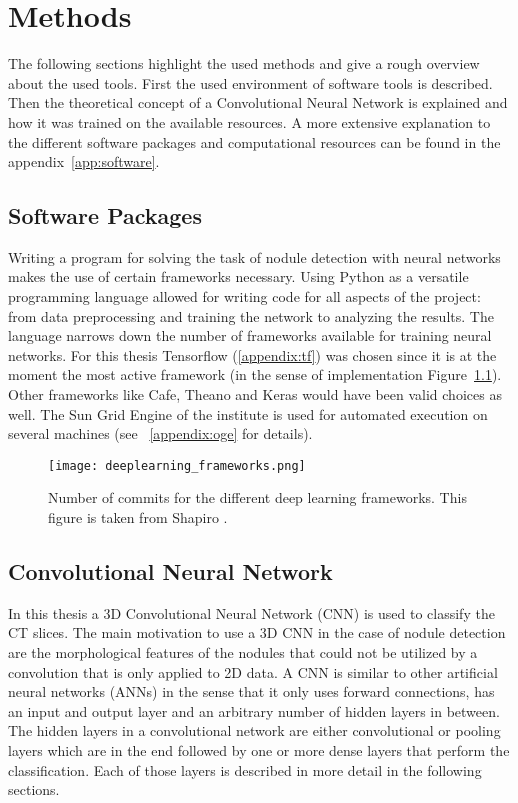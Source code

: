 \documentclass[main.tex]{subfiles}
\begin{document}
\chapter{Methods}\label{chap:methods}
The following sections highlight the used methods and give a rough overview about the used tools. First the used environment of software tools is described. Then the theoretical concept of a Convolutional Neural Network is explained and how it was trained on the available resources. A more extensive explanation to the different software packages and computational resources can be found in the appendix~\ref{app:software}.

\section{Software Packages}
Writing a program for solving the task of nodule detection with neural networks makes the use of certain frameworks necessary. Using Python as a versatile programming language allowed for writing code for all aspects of the project: from data preprocessing and training the network to analyzing the results. The language narrows down the number of frameworks available for training neural networks. For this thesis Tensorflow (\ref{appendix:tf}) was chosen since it is at the moment the most active framework (in the sense of implementation  Figure~\ref{fig:frameworks}). Other frameworks like Cafe, Theano and Keras would have been valid choices as well. The Sun Grid Engine of the institute is used for automated execution on several machines (see ~\ref{appendix:oge} for details).


\begin{figure}
\begin{center}
\texttt{[image: deeplearning\_frameworks.png]}
\end{center}
\caption{Number of commits for the different deep learning frameworks. This figure is taken from Shapiro \cite{shapiro2017}.}
\label{fig:frameworks}
\end{figure}



\section{Convolutional Neural Network}
In this thesis a 3D Convolutional Neural Network (CNN) is used to classify the CT slices. The main motivation to use a 3D CNN in the case of nodule detection are the morphological features of the nodules that could not be utilized by a convolution that is only applied to 2D data. A CNN is similar to other artificial neural networks (ANNs) in the sense that it only uses forward connections, has an input and output layer and an arbitrary number of hidden layers in between. The hidden layers in a convolutional network are either convolutional or pooling layers which are in the end followed by one or more dense layers that perform the classification. Each of those layers is described in more detail in the following sections.
\end{document}
